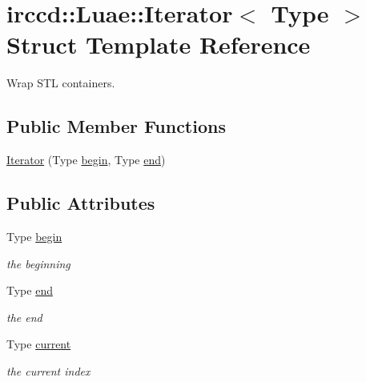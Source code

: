 \hypertarget{a00037}{\section{irccd\-:\-:Luae\-:\-:Iterator$<$ Type $>$ Struct Template Reference}
\label{a00037}
}


Wrap S\-T\-L containers.  


\subsection*{Public Member Functions}
\begin{DoxyCompactItemize}
\item 
\hyperlink{a00037_a2c57e7cb550f90465696b638e3d6d5c0}{Iterator} (Type \hyperlink{a00037_ac2c48b0a9fecdecec496eab72c6cfbeb}{begin}, Type \hyperlink{a00037_aafda8501506abf8b6b3a9b970bc25b45}{end})
\end{DoxyCompactItemize}
\subsection*{Public Attributes}
\begin{DoxyCompactItemize}
\item 
\hypertarget{a00037_ac2c48b0a9fecdecec496eab72c6cfbeb}{Type \hyperlink{a00037_ac2c48b0a9fecdecec496eab72c6cfbeb}{begin}}\label{a00037_ac2c48b0a9fecdecec496eab72c6cfbeb}

\begin{DoxyCompactList}\small\item\em the beginning \end{DoxyCompactList}\item 
\hypertarget{a00037_aafda8501506abf8b6b3a9b970bc25b45}{Type \hyperlink{a00037_aafda8501506abf8b6b3a9b970bc25b45}{end}}\label{a00037_aafda8501506abf8b6b3a9b970bc25b45}

\begin{DoxyCompactList}\small\item\em the end \end{DoxyCompactList}\item 
\hypertarget{a00037_ad135d67d30167c1110065e530edf2cba}{Type \hyperlink{a00037_ad135d67d30167c1110065e530edf2cba}{current}}\label{a00037_ad135d67d30167c1110065e530edf2cba}

\begin{DoxyCompactList}\small\item\em the current index \end{DoxyCompactList}\end{DoxyCompactItemize}


